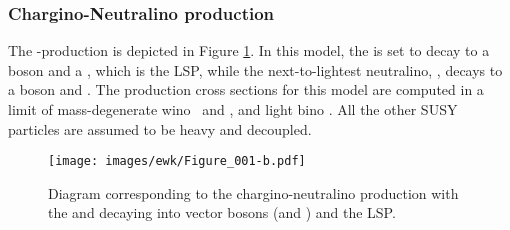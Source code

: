 \subsubsection*{Chargino-Neutralino production}
\noindent\justify
The \firstcharg-\secondchi production is depicted in Figure \ref{sig:feynmanChargino}. 
In this model, the \firstcharg is set to decay to a \PW boson and a \firstchi, which is the LSP, while the next-to-lightest neutralino, \secondchi, decays to a \PZ boson and \firstchi.
The production cross sections for this model are computed in a limit of mass-degenerate wino \firstcharg\ and \secondchi, and light bino \firstchi.  
All the other SUSY particles are assumed to be heavy and decoupled.
\begin{figure}[!htp]
\centering
\texttt{[image: images/ewk/Figure\_001-b.pdf]}\\
\caption{Diagram corresponding to the chargino-neutralino production with the \firstcharg and \secondchi decaying into vector bosons (\PW and \PZ) and the LSP.} 
\label{sig:feynmanChargino}
\end{figure}                                                                                                                                                                    
